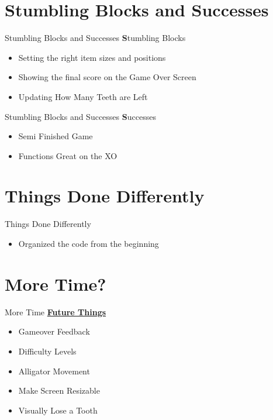 \documentclass[10pt, compress]{beamer}
\begin{document}
\section{Stumbling Blocks and Successes}

\begin{frame}{Stumbling Blocks and Successes}
    \textbf Stumbling Blocks
    \begin{itemize}
    \item Setting the right item sizes and positions
    \item Showing the final score on the Game Over Screen
    \item Updating How Many Teeth are Left
    \end{itemize}
\end{frame}

\begin{frame}{Stumbling Blocks and Successes}
    \textbf Successes
    \begin{itemize}
    \item Semi Finished Game
    \item Functions Great on the XO
    \end{itemize}
\end{frame}

\section{Things Done Differently}

\begin{frame}{Things Done Differently}
    \begin{itemize}
    \item Organized the code from the beginning
    \end{itemize}
\end{frame}

\section{More Time?}

\begin{frame}{More Time}
    \textbf{\href{https://github.com/amm4108/AngleGators/issues?q=is\%3Aopen+is\%3Aissue+milestone\%3A\%22Future+Things\%22}{Future Things}}
    \begin{itemize}
    \item Gameover Feedback
    \item Difficulty Levels
    \item Alligator Movement
    \item Make Screen Resizable
    \item Visually Lose a Tooth
    \end{itemize}
    
\end{frame}
\end{document}
